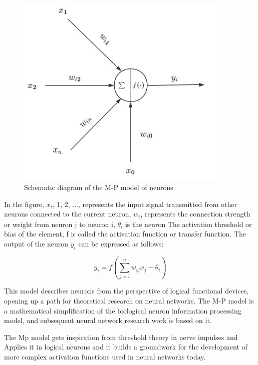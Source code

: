 \documentclass[12pt,a4paper]{report}
\begin{document}
\begin{figure}[H]
    \centering
    \includegraphics[width=0.9\textwidth]{./data/M-P.jpg}
    \caption{Schematic diagram of the M-P model of neurons}
    \label{fig:my_picture}
    \vspace{1pt} %
\end{figure}

In the figure, $x_i$, 1, 2, ..., represents the input signal transmitted from other neurons connected to the current neuron, $w_{ij}$ represents the connection strength or weight from neuron j to neuron i, $\theta_i$ is the neuron The activation threshold or bias of the element, f is called the activation function or transfer function. The output of the neuron $y_i$ can be expressed as follows:

\begin{equation}
    y_i = f(\sum_{j=i}^{n} w_{ij}x_j-\theta_i)
\end{equation}

This model describes neurons from the perspective of logical functional devices, opening up a path for theoretical research on neural networks. The M-P model is a mathematical simplification of the biological neuron information processing model, and subsequent neural network research work is based on it. 

The Mp model gets inspiration from threshold theory in nerve impulses and Applies it in logical neurons and it builds a groundwork for the development of more complex activation functions used in neural networks today.
\end{document}
